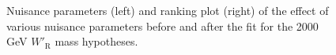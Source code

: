 \begin{figure}[H]
  \centering
  \caption{Nuisance parameters (left) and ranking plot (right) of the effect of various nuisance parameters before and after the fit for the 2000 GeV $W'_{\text{R}}$ mass hypotheses.}
  \label{fig:NuisParAndRanking_WpRH2000}
\end{figure}
